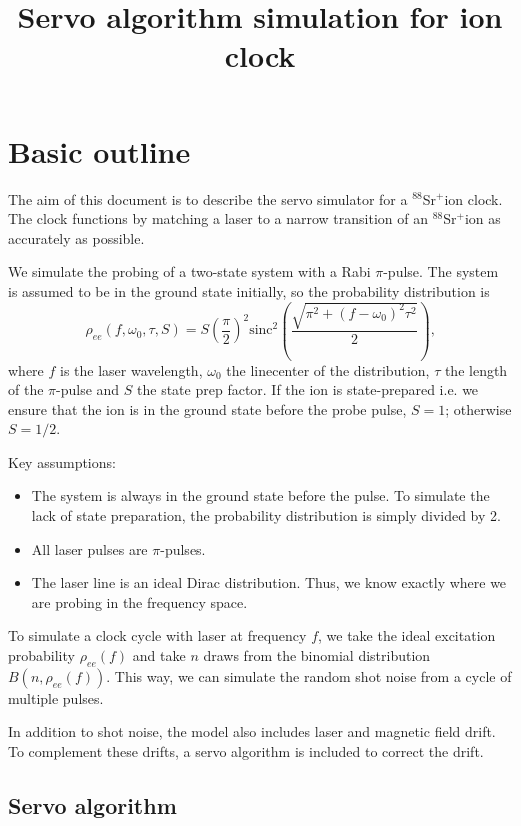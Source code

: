 \documentclass[a4paper,12pt]{article}
\title{Servo algorithm simulation for \sr ion clock}
\newcommand{\sr}{$^{88}$Sr$^+$}
\begin{document}
\maketitle

\section{Basic outline}

The aim of this document is to describe the servo simulator for a \sr ion clock.
The clock functions by matching a laser to a narrow transition of an \sr ion 
as accurately as possible.

We simulate the probing of a two-state system with a Rabi $\pi$-pulse.
The system is assumed to be in the ground state initially, so the probability
distribution is
\begin{equation}
    \rho_{ee}(f, \omega_0, \tau, S) = S \left( \frac{\pi}{2} \right)^2 \textrm{sinc}^2 
    \left( \frac{\sqrt{\pi^2 + (f-\omega_0)^2 \tau^2}}{2} \right) \text{,}
\end{equation}
where $f$ is the laser wavelength, $\omega_0$ the linecenter of the distribution,
$\tau$ the length of the $\pi$-pulse and $S$ the state prep factor.
If the ion is state-prepared i.e. we ensure that the ion is in the ground state
before the probe pulse, $S=1$; otherwise $S=1/2$.

Key assumptions:
\begin{itemize}
    \item The system is always in the ground state before the pulse.
    To simulate the lack of state preparation, the probability distribution
    is simply divided by 2.
    \item All laser pulses are $\pi$-pulses.
    \item The laser line is an ideal Dirac distribution.
    Thus, we know exactly where we are probing in the frequency space.
\end{itemize}

To simulate a clock cycle with laser at frequency $f$, we take the ideal excitation
probability $\rho_{ee}(f)$ and take $n$ draws from the binomial distribution
$B(n, \rho_{ee}(f))$.
This way, we can simulate the random shot noise from a cycle of multiple pulses.

In addition to shot noise, the model also includes laser and magnetic field
drift.
To complement these drifts, a servo algorithm is included to correct the
drift.
\subsection{Servo algorithm}
\end{document}
